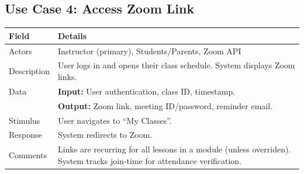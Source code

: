 

\subsection{Use Case 4: Access Zoom Link}

\begin{tabular}{|p{3.5cm}|p{11cm}|}
\hline
\textbf{Field} & \textbf{Details} \\ \hline
Actors & Instructor (primary), Students/Parents, Zoom API \\ \hline
Description & User logs in and opens their class schedule. System displays Zoom links. \\ \hline
Data & \textbf{Input:} User authentication, class ID, timestamp. \\
& \textbf{Output:} Zoom link, meeting ID/password, reminder email. \\ \hline
Stimulus & User navigates to ``My Classes''. \\ \hline
Response & System redirects to Zoom. \\ \hline
Comments & Links are recurring for all lessons in a module (unless overriden). System tracks join-time for attendance verification. \\ \hline
\end{tabular}

